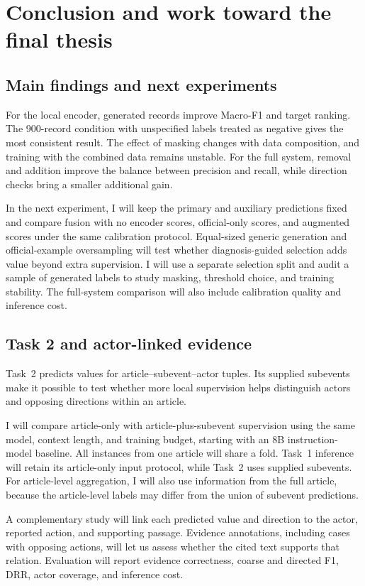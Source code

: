 \documentclass[12pt,a4paper]{article}
\begin{document}
\sectionbreak
\section{Conclusion and work toward the final thesis}\label{sec:conclusion}
\subsection{Main findings and next experiments}
For the local encoder, generated records improve Macro-F1 and target ranking. The 900-record condition with unspecified labels treated as negative gives the most consistent result. The effect of masking changes with data composition, and training with the combined data remains unstable. For the full system, removal and addition improve the balance between precision and recall, while direction checks bring a smaller additional gain.

In the next experiment, I will keep the primary and auxiliary predictions fixed and compare fusion with no encoder scores, official-only scores, and augmented scores under the same calibration protocol. Equal-sized generic generation and official-example oversampling will test whether diagnosis-guided selection adds value beyond extra supervision. I will use a separate selection split and audit a sample of generated labels to study masking, threshold choice, and training stability. The full-system comparison will also include calibration quality and inference cost.

\subsection{Task 2 and actor-linked evidence}
Task~2 predicts values for article--subevent--actor tuples. Its supplied subevents make it possible to test whether more local supervision helps distinguish actors and opposing directions within an article.

I will compare article-only with article-plus-subevent supervision using the same model, context length, and training budget, starting with an 8B instruction-model baseline. All instances from one article will share a fold. Task~1 inference will retain its article-only input protocol, while Task~2 uses supplied subevents. For article-level aggregation, I will also use information from the full article, because the article-level labels may differ from the union of subevent predictions.

A complementary study will link each predicted value and direction to the actor, reported action, and supporting passage. Evidence annotations, including cases with opposing actions, will let us assess whether the cited text supports that relation. Evaluation will report evidence correctness, coarse and directed F1, DRR, actor coverage, and inference cost.
\end{document}
